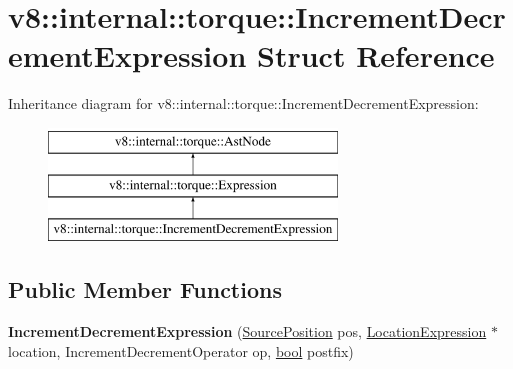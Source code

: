 \hypertarget{structv8_1_1internal_1_1torque_1_1IncrementDecrementExpression}{}\section{v8\+:\+:internal\+:\+:torque\+:\+:Increment\+Decrement\+Expression Struct Reference}
\label{structv8_1_1internal_1_1torque_1_1IncrementDecrementExpression}
Inheritance diagram for v8\+:\+:internal\+:\+:torque\+:\+:Increment\+Decrement\+Expression\+:\begin{figure}[H]
\begin{center}
\leavevmode
\includegraphics[height=3.000000cm]{structv8_1_1internal_1_1torque_1_1IncrementDecrementExpression}
\end{center}
\end{figure}
\subsection*{Public Member Functions}
\begin{DoxyCompactItemize}
\item 
\mbox{\label{structv8_1_1internal_1_1torque_1_1IncrementDecrementExpression_a1eb5f1651cbd19fc6d6feb45415920f0}} 
{\bfseries Increment\+Decrement\+Expression} (\mbox{\hyperlink{structv8_1_1internal_1_1torque_1_1SourcePosition}{Source\+Position}} pos, \mbox{\hyperlink{structv8_1_1internal_1_1torque_1_1LocationExpression}{Location\+Expression}} $\ast$location, Increment\+Decrement\+Operator op, \mbox{\hyperlink{classbool}{bool}} postfix)
\end{DoxyCompactItemize}
